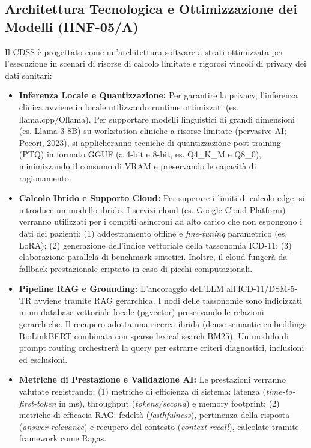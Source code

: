 \documentclass[11pt,a4paper]{article}
\begin{document}
\subsection{Architettura Tecnologica e Ottimizzazione dei Modelli (IINF-05/A)}
Il CDSS è progettato come un'architettura software a strati ottimizzata per l'esecuzione in scenari di risorse di calcolo limitate e rigorosi vincoli di privacy dei dati sanitari:
\begin{itemize}
    \item \textbf{Inferenza Locale e Quantizzazione:} Per garantire la privacy, l'inferenza clinica avviene in locale utilizzando runtime ottimizzati (es. llama.cpp/Ollama). Per supportare modelli linguistici di grandi dimensioni (es. Llama-3-8B) su workstation cliniche a risorse limitate (pervasive AI; Pecori, 2023), si applicheranno tecniche di quantizzazione post-training (PTQ) in formato GGUF (a 4-bit e 8-bit, es. Q4\_K\_M e Q8\_0), minimizzando il consumo di VRAM e preservando le capacità di ragionamento.
    \item \textbf{Calcolo Ibrido e Supporto Cloud:} Per superare i limiti di calcolo edge, si introduce un modello ibrido. I servizi cloud (es. Google Cloud Platform) verranno utilizzati per i compiti asincroni ad alto carico che non espongono i dati dei pazienti: (1) addestramento offline e \textit{fine-tuning} parametrico (es. LoRA); (2) generazione dell'indice vettoriale della tassonomia ICD-11; (3) elaborazione parallela di benchmark sintetici. Inoltre, il cloud fungerà da fallback prestazionale criptato in caso di picchi computazionali.
    \item \textbf{Pipeline RAG e Grounding:} L'ancoraggio dell'LLM all'ICD-11/DSM-5-TR avviene tramite RAG gerarchica. I nodi delle tassonomie sono indicizzati in un database vettoriale locale (pgvector) preservando le relazioni gerarchiche. Il recupero adotta una ricerca ibrida (dense semantic embeddings BioLinkBERT combinata con sparse lexical search BM25). Un modulo di prompt routing orchestrerà la query per estrarre criteri diagnostici, inclusioni ed esclusioni.
    \item \textbf{Metriche di Prestazione e Validazione AI:} Le prestazioni verranno valutate registrando: (1) metriche di efficienza di sistema: latenza (\textit{time-to-first-token} in ms), throughput (\textit{tokens/second}) e memory footprint; (2) metriche di efficacia RAG: fedeltà (\textit{faithfulness}), pertinenza della risposta (\textit{answer relevance}) e recupero del contesto (\textit{context recall}), calcolate tramite framework come Ragas.
\end{itemize}
\end{document}
